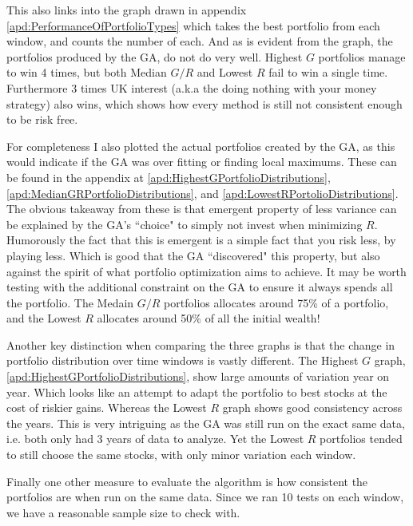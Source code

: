 \documentclass[11pt]{article}
\begin{document}
    This also links into the graph drawn in appendix \ref{apd:PerformanceOfPortfolioTypes}
    which takes the best portfolio from each window, and counts the number of each.
    And as is evident from the graph, the portfolios produced by the GA, do not
    do very well. Highest \(G\) portfolios manage to win 4 times, but both
    Median \(G/R\) and Lowest \(R\) fail to win a single time. Furthermore 3
    times UK interest (a.k.a the doing nothing with your money strategy)
    also wins, which shows how every method is still not consistent enough to
    be risk free.

    For completeness I also plotted the actual portfolios created by the GA, as this
    would indicate if the GA was over fitting or finding local maximums. These can
    be found in the appendix at \ref{apd:HighestGPortfolioDistributions},
    \ref{apd:MedianGRPortfolioDistributions}, and
    \ref{apd:LowestRPortolioDistributions}. The obvious takeaway from these is that
    emergent property of less variance can be explained by the GA's ``choice" to
    simply not invest when minimizing \(R\). Humorously the fact that this is emergent
    is a simple fact that you risk less, by playing less. Which is good that the GA
    ``discovered" this property, but also against the spirit of what portfolio
    optimization aims to achieve. It may be worth testing with the additional
    constraint on the GA to ensure it always spends all the portfolio. The Medain
    \(G/R\) portfolios allocates around 75\% of a portfolio,
    and the Lowest \(R\) allocates around 50\% of all the initial wealth!

    Another key distinction when comparing the three graphs is that the change in
    portfolio distribution over time windows is vastly different. The Highest
    \(G\) graph, \ref{apd:HighestGPortfolioDistributions}, show large amounts
    of variation year on year. Which looks like an attempt to adapt the portfolio
    to best stocks at the cost of riskier gains. Whereas the Lowest \(R\) graph
    shows good consistency across the years. This is very intriguing as the
    GA was still run on the exact same data, i.e. both only had 3 years of data to
    analyze. Yet the Lowest \(R\) portfolios tended to still choose the same stocks,
    with only minor variation each window.

    Finally one other measure to evaluate the algorithm is how consistent the portfolios
    are when run on the same data. Since we ran 10 tests on each window, we have a reasonable
    sample size to check with.
\end{document}
